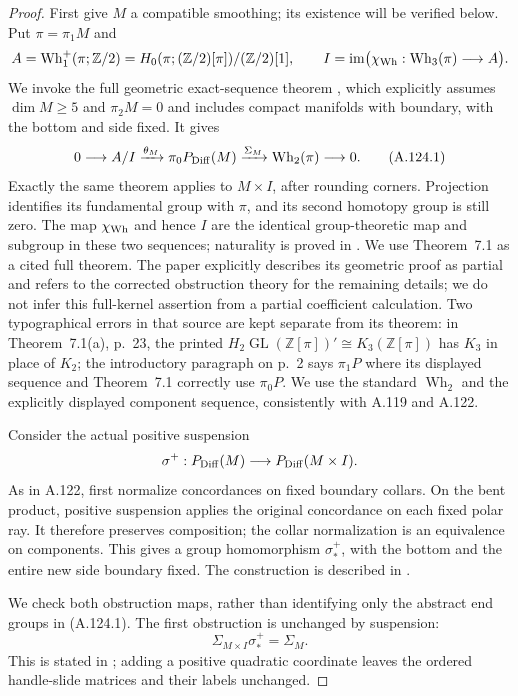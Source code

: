 \begin{proof}
First give $M$ a compatible smoothing; its existence will be
verified below. Put $\pi=\pi_1M$ and
\[
 A=\operatorname{Wh}_1^+(\pi;\mathbb Z/2)
   =H_0(\pi;(\mathbb Z/2)[\pi])/(\mathbb Z/2)[1],
 \qquad
 I=\operatorname{im}\bigl(
 \chi_{\rm Wh}:\operatorname{Wh}_3(\pi)\longrightarrow A\bigr).
\]
We invoke the full geometric exact-sequence theorem
\cite[Theorem~7.1, p.~23]{Igusa2025}, which explicitly assumes
$\dim M\geq5$ and $\pi_2M=0$ and includes compact manifolds
with boundary, with the bottom and side fixed. It gives
\[
 0\longrightarrow A/I\xrightarrow{\theta_M}
 \pi_0P_{\rm Diff}(M)\xrightarrow{\Sigma_M}
 \operatorname{Wh}_2(\pi)\longrightarrow0.              \tag{A.124.1}
\]
Exactly the same theorem applies to $M\times I$, after rounding
corners. Projection identifies its fundamental group with
$\pi$, and its second homotopy group is still zero. The map
$\chi_{\rm Wh}$ and hence $I$ are the identical group-theoretic
map and subgroup in these two sequences; naturality is proved
in \cite[Section~4, pp.~14--16]{Igusa2025}.
We use Theorem~7.1 as a cited full theorem. The paper explicitly
describes its geometric proof as partial and refers to the
corrected obstruction theory for the remaining details; we do
not infer this full-kernel assertion from a partial coefficient
calculation.
Two typographical errors in that source are kept separate from
its theorem: in Theorem~7.1(a), p.~23, the printed
$H_2\operatorname{GL}(\mathbb Z[\pi])'\cong K_3(\mathbb Z[\pi])$
has $K_3$ in place of $K_2$; the introductory paragraph on
p.~2 says $\pi_1P$ where its displayed sequence and Theorem~7.1
correctly use $\pi_0P$. We use the standard
$\operatorname{Wh}_2$ and the explicitly displayed component
sequence, consistently with A.119 and A.122.

Consider the actual positive suspension
\[
 \sigma^+:P_{\rm Diff}(M)\longrightarrow
                   P_{\rm Diff}(M\times I).
\]
As in A.122, first normalize concordances on fixed boundary
collars. On the bent product, positive suspension applies the
original concordance on each fixed polar ray. It therefore
preserves composition; the collar normalization is an
equivalence on components. This gives a group homomorphism
$\sigma^+_*$, with the bottom and the entire new side boundary
fixed. The construction is described in
\cite[Section~4.1, p.~8]{Igusa2021Dimension3}.

We check both obstruction maps, rather than identifying only
the abstract end groups in (A.124.1).
The first obstruction is unchanged by suspension:
\[
 \Sigma_{M\times I}\sigma^+_* =\Sigma_M.               \tag{A.124.2}
\]
This is stated in \cite[Part~I, p.~130, following
Section~I.5(5.2), p.~60]{HatcherWagoner1973}; adding a positive
quadratic coordinate leaves the ordered handle-slide matrices
and their labels unchanged.


\end{proof}
